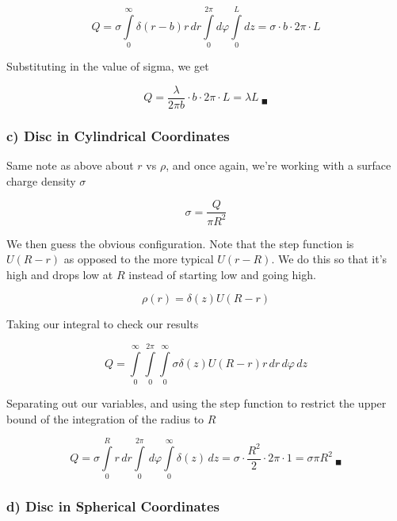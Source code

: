 \begin{equation}
  Q =
  \sigma
  \int\limits_0^\infty \delta(r-b)r\,dr
  \int\limits_0^{2\pi} d\varphi
  \int\limits_0^L dz
  = \sigma \cdot b \cdot 2\pi \cdot L
\end{equation}

Substituting in the value of sigma, we get

\begin{equation}
  Q = \frac{\lambda}{2 \pi{} b} \cdot b \cdot 2\pi \cdot L = \lambda L
  \ _\blacksquare
\end{equation}


\subsubsection*{c) Disc in Cylindrical Coordinates}

Same note as above about $r$ vs $\rho$, and once again, we're working
with a surface charge density $\sigma$

\begin{equation}
  \sigma = \frac{Q}{\pi R^2}
\end{equation}

We then guess the obvious configuration.  Note that the step function
is $U(R-r)$ as opposed to the more typical $U(r-R)$.  We do this so
that it's high and drops low at $R$ instead of starting low and going
high.

\begin{equation}
  \rho(r) = \delta(z) U(R-r)
\end{equation}

Taking our integral to check our results

\begin{equation}
  Q =
  \int\limits_0^\infty
  \int\limits_0^{2\pi}
  \int\limits_0^\infty
  \sigma \delta(z) U(R-r)
  r
  \,dr
  \,d\varphi
  \,dz
\end{equation}

Separating out our variables, and using the step function to restrict
the upper bound of the integration of the radius to $R$

\begin{equation}
  Q =
  \sigma
  \int\limits_0^R
  r
  \,dr
  \int\limits_0^{2\pi}
  \,d\varphi
  \int\limits_0^\infty
  \delta(z)
  \,dz
  = \sigma \cdot \frac{R^2}{2} \cdot 2\pi \cdot 1
  = \sigma \pi R^2
  \ _\blacksquare
\end{equation}


\subsubsection*{d) Disc in Spherical Coordinates}

